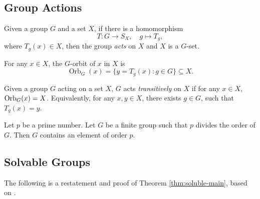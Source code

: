 \subsection{Group Actions}



\begin{definition} \label{def:action}
	Given a group $G$ and a set $X$, if there is a homomorphism
	$$
	T: G \rightarrow S_X, \quad g \mapsto T_g,
	$$
	where $T_g(x) \in X$, then the group \textit{acts} on $X$ and $X$ is a $G$-set. 
\end{definition}

\begin{definition}
	For any $x \in X$, the $G$-orbit of $x$ in $X$ is
	$$\operatorname{Orb}_G(x) = \{ y = T_g(x) : g \in G \} \subseteq X.$$

	
\end{definition}

\begin{definition} \label{def:transitive-action}
	Given a group $G$ acting on a set $X$, $G$ acts \textit{transitively} on $X$ if for any $x \in X$, $\operatorname{Orb}_G(x) = X$. Equivalently, for any $x, y\in X$, there exists $g \in G$, such that $T_g(x) = y$. 
\end{definition}

\begin{theorem} \label{thm:cauchy}
	Let $p$ be a prime number. Let $G$ be a finite group such that $p$ divides the order of $G$. Then $G$ contains an element of order $p$. 
\end{theorem}

\subsection{Solvable Groups}

The following is a restatement and proof of Theorem \ref{thm:soluble-main}, based on \cite{Stewart}.


